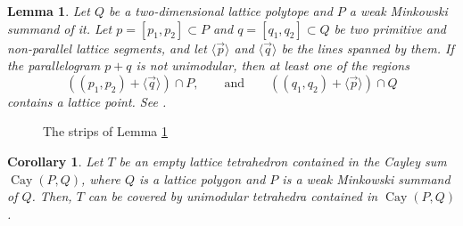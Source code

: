 \documentclass{amsart}
\theoremstyle{plain}
\newtheorem{lemma}[theorem]{Lemma}
\newtheorem{corollary}[theorem]{Corollary}
\theoremstyle{definition}
\renewcommand{\vec}[1]{\overrightarrow#1}
\newcommand{\vecline}[1]{\langle \vec #1 \rangle}
\newcommand{\cayley}{\operatorname{Cay}}
\begin{document}
\begin{lemma}
\label{lemma:cayley}
Let $Q$ be a two-dimensional lattice polytope and $P$ a weak Minkowski summand of it. 
Let $p=[p_1,p_2] \subset P$ and $q=[q_1,q_2]\subset Q$ be two primitive and non-parallel lattice segments, and let $\vecline p$ and $ \vecline q$ be the lines spanned by them.  If the parallelogram $p + q$ is not unimodular, then at least one of the regions
\[
((p_1, p_2) + \vecline q ) \cap P, 
\qquad \text{and} \qquad
((q_1, q_2) + \vecline p ) \cap Q
\]
contains a lattice point. See .
\end{lemma}

\begin{figure}[htb]
\scalebox{.75}{}
\caption{The strips  of Lemma \ref{lemma:cayley}}
\label{fig:strips}
\end{figure}

\begin{corollary}
\label{coro:covercayley}
Let $T$ be an empty lattice tetrahedron contained in the Cayley sum $\cayley(P,Q)$, where $Q$ is a lattice polygon and $P$ is a weak Minkowski summand of $Q$. Then, $T$ can be covered by unimodular tetrahedra contained in $\cayley(P,Q)$.
\end{corollary}
\end{document}
